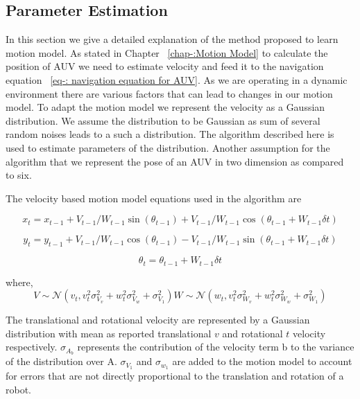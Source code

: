 \documentclass[12pt]{dalcsthesis}
\begin{document}
\subsection{Parameter Estimation}
\label{ch:adapting the motion model}
In this section we give a detailed explanation of the method proposed to learn motion model. As stated in Chapter ~\ref{chap-:Motion Model} to calculate the position of AUV we need to estimate velocity and feed it to the navigation equation ~\ref{eq-: navigation equation for AUV}. As we are operating in a dynamic environment there are various factors that can lead to changes in our motion model. To adapt the motion model we represent the velocity as a Gaussian distribution. We assume the distribution to be Gaussian as sum of several random noises leads to a such a distribution.   The algorithm described here is used to estimate parameters of the distribution. Another assumption for the algorithm that we represent the pose of an AUV in two dimension as compared to six. 

The velocity based motion model equations used in the algorithm are 

\begin{equation}
 x_{t}=x_{t-1}+V_{t-1}/W_{t-1} \sin(\theta_{t-1})+ V_{t-1}/W_{t-1} \cos(\theta_{t-1} + W_{t-1} \delta t)
\end{equation}

\begin{equation}
\label{eq:velocity motion model_y}
y_{t}=y_{t-1}+V_{t-1}/W_{t-1} \cos(\theta_{t-1})- V_{t-1}/W_{t-1} \sin(\theta_{t-1} + W_{t-1} \delta t)
\end{equation}

\begin{equation}
\label{eq:velocity motion model_theta}
\theta_{t}=\theta_{t-1}+ W_{t-1} \delta t
\end{equation}

where,
\begin{equation}
V \sim \mathcal{N}(v_{t},v_{t}^{2}\sigma_{V_{v}}^{2}+w_{t}^{2}\sigma_{V_{w}}^{2}+\sigma_{V_{1}}^{2})
W \sim \mathcal{N}(w_{t},v_{t}^{2}\sigma_{W_{v}}^{2}+w_{t}^{2}\sigma_{W_{w}}^{2}+\sigma_{W_{1}}^{2})
\end{equation}


The translational and rotational velocity are represented by a Gaussian distribution with mean as reported translational $v$ and rotational $t$ velocity respectively. $\sigma_{A_{b}}$ represents the contribution of the velocity term b to the variance of the distribution over A. $\sigma_{V_{1}} $ and $\sigma_{w_{1}}$ are added to the motion model to account for errors that are not directly proportional to the translation and rotation of a robot.
\end{document}
